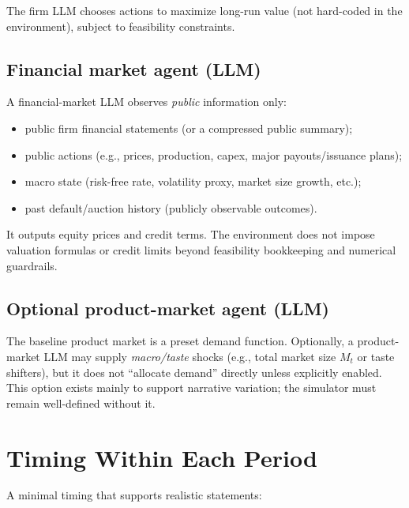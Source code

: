 \documentclass[11pt]{article}
\begin{document}
The firm LLM chooses actions to maximize long-run value (not hard-coded in the environment), subject to feasibility constraints.

\subsection{Financial market agent (LLM)}
A financial-market LLM observes \emph{public} information only:
\begin{itemize}[leftmargin=*]
    \item public firm financial statements (or a compressed public summary);
    \item public actions (e.g., prices, production, capex, major payouts/issuance plans);
    \item macro state (risk-free rate, volatility proxy, market size growth, etc.);
    \item past default/auction history (publicly observable outcomes).
\end{itemize}

It outputs equity prices and credit terms. The environment does not impose valuation formulas or credit limits beyond feasibility bookkeeping and numerical guardrails.

\subsection{Optional product-market agent (LLM)}
The baseline product market is a preset demand function. Optionally, a product-market LLM may supply \emph{macro/taste} shocks (e.g., total market size $M_t$ or taste shifters), but it does not ``allocate demand'' directly unless explicitly enabled. This option exists mainly to support narrative variation; the simulator must remain well-defined without it.

\section{Timing Within Each Period}

A minimal timing that supports realistic statements:
\end{document}
